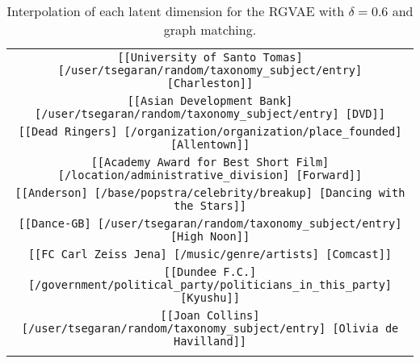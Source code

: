 \begin{longtable}{|c|}
    \texttt{[[University of Santo Tomas] [/user/tsegaran/random/taxonomy\_subject/entry] [Charleston]]}\\
    \texttt{[[Asian Development Bank] [/user/tsegaran/random/taxonomy\_subject/entry] [DVD]]}\\
    \texttt{[[Dead Ringers] [/organization/organization/place\_founded] [Allentown]]}\\
    \texttt{[[Academy Award for Best Short Film] [/location/administrative\_division] [Forward]]}\\
    \texttt{[[Anderson] [/base/popstra/celebrity/breakup] [Dancing with the Stars]]}\\
    \texttt{[[Dance-GB] [/user/tsegaran/random/taxonomy\_subject/entry] [High Noon]]}\\
    \texttt{[[FC Carl Zeiss Jena] [/music/genre/artists] [Comcast]]}\\
    \texttt{[[Dundee F.C.] [/government/political\_party/politicians\_in\_this\_party] [Kyushu]]}\\
    \texttt{[[Joan Collins] [/user/tsegaran/random/taxonomy\_subject/entry] [Olivia de Havilland]]}\\
    \hline
    \caption{Interpolation of each latent dimension for the RGVAE with $\delta=0.6$ and graph matching.}
\label{annexA:ipdim95Delta}
\end{longtable}

